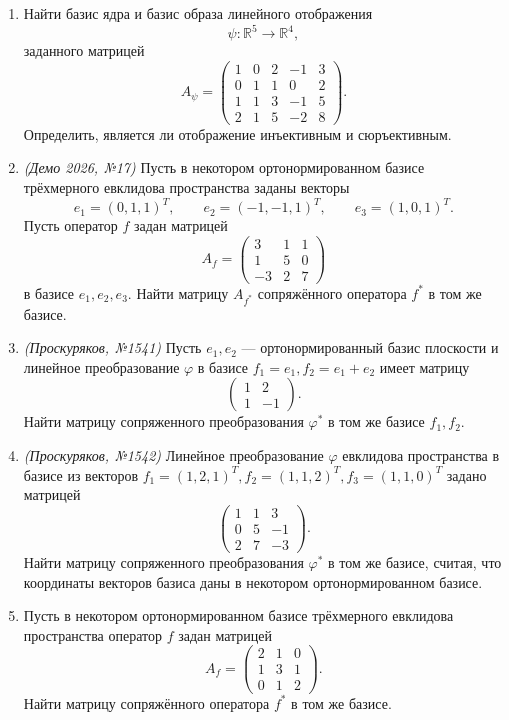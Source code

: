 \begin{enumerate}
    \item
    Найти базис ядра и базис образа линейного отображения
    \[
    \psi:\mathbb{R}^5\to\mathbb{R}^4,
    \]
    заданного матрицей
    \[
    A_\psi=
    \begin{pmatrix}
    1 & 0 & 2 & -1 & 3 \\
    0 & 1 & 1 & 0 & 2 \\
    1 & 1 & 3 & -1 & 5 \\
    2 & 1 & 5 & -2 & 8
    \end{pmatrix}.
    \]
    Определить, является ли отображение инъективным и сюръективным.

    \item \textit{(Демо 2026, №17)}
    Пусть в некотором ортонормированном базисе трёхмерного евклидова пространства заданы векторы
    \[
    e_1=(0,1,1)^T,\qquad e_2=(-1,-1,1)^T,\qquad e_3=(1,0,1)^T.
    \]
    Пусть оператор $f$ задан матрицей
    \[
    A_f=
    \begin{pmatrix}
    3 & 1 & 1 \\
    1 & 5 & 0 \\
    -3 & 2 & 7
    \end{pmatrix}
    \]
    в базисе $e_1,e_2,e_3$.
    Найти матрицу $A_{f^*}$ сопряжённого оператора $f^*$ в том же базисе.

    \item \textit{(Проскуряков, №1541)} Пусть $e_1, e_2$ — ортонормированный базис плоскости и линейное преобразование $\varphi$ в базисе $f_1 = e_1, f_2 = e_1 + e_2$ имеет матрицу
    \[
    \begin{pmatrix} 1 & 2 \\ 1 & -1 \end{pmatrix}.
    \]
    Найти матрицу сопряженного преобразования $\varphi^*$ в том же базисе $f_1, f_2$.

    \item \textit{(Проскуряков, №1542)} Линейное преобразование $\varphi$ евклидова пространства в базисе из векторов $f_1 = (1, 2, 1)^T, f_2 = (1, 1, 2)^T, f_3 = (1, 1, 0)^T$ задано матрицей
    \[
    \begin{pmatrix} 1 & 1 & 3 \\ 0 & 5 & -1 \\ 2 & 7 & -3 \end{pmatrix}.
    \]
    Найти матрицу сопряженного преобразования $\varphi^*$ в том же базисе, считая, что координаты векторов базиса даны в некотором ортонормированном базисе.

    \item
    Пусть в некотором ортонормированном базисе трёхмерного евклидова пространства оператор $f$ задан матрицей
    \[
    A_f=
    \begin{pmatrix}
    2 & 1 & 0 \\
    1 & 3 & 1 \\
    0 & 1 & 2
    \end{pmatrix}.
    \]
    Найти матрицу сопряжённого оператора $f^*$ в том же базисе.


\end{enumerate}
